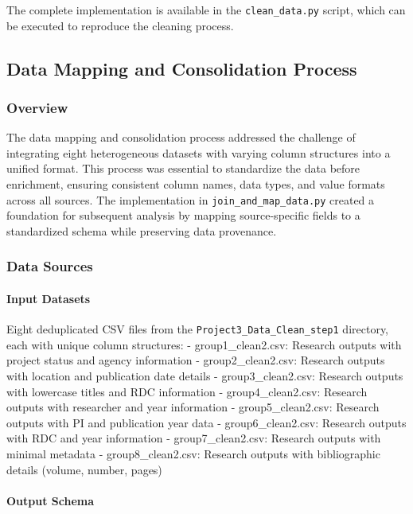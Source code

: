 \documentclass[12pt]{article}
\begin{document}
The complete implementation is available in the \texttt{clean\_data.py}
script, which can be executed to reproduce the cleaning process.

\subsection{Data Mapping and Consolidation
Process}\label{data-mapping-and-consolidation-process}

\subsubsection{Overview}\label{overview-1}

The data mapping and consolidation process addressed the challenge of
integrating eight heterogeneous datasets with varying column structures
into a unified format. This process was essential to standardize the
data before enrichment, ensuring consistent column names, data types,
and value formats across all sources. The implementation in
\texttt{join\_and\_map\_data.py} created a foundation for subsequent
analysis by mapping source-specific fields to a standardized schema
while preserving data provenance.

\subsubsection{Data Sources}\label{data-sources-1}

\paragraph{Input Datasets}\label{input-datasets}

Eight deduplicated CSV files from the
\texttt{Project3\_Data\_Clean\_step1} directory, each with unique column
structures: - group1\_clean2.csv: Research outputs with project status
and agency information - group2\_clean2.csv: Research outputs with
location and publication date details - group3\_clean2.csv: Research
outputs with lowercase titles and RDC information - group4\_clean2.csv:
Research outputs with researcher and year information -
group5\_clean2.csv: Research outputs with PI and publication year data -
group6\_clean2.csv: Research outputs with RDC and year information -
group7\_clean2.csv: Research outputs with minimal metadata -
group8\_clean2.csv: Research outputs with bibliographic details (volume,
number, pages)

\paragraph{Output Schema}\label{output-schema}
\end{document}
